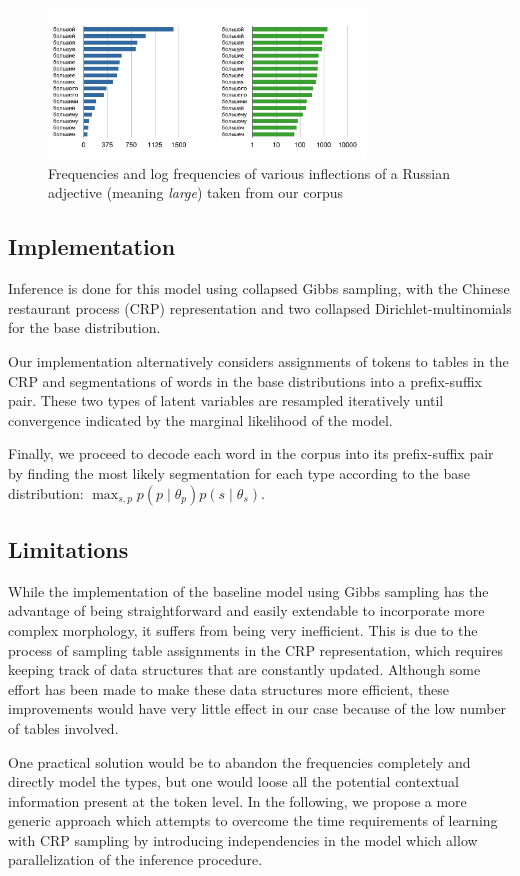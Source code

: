 \begin{figure}[h]
  \centering
  \includegraphics[width=0.75\textwidth]{fig/frequencies}
  \caption{Frequencies and log frequencies of various inflections of a Russian adjective (meaning \textit{large}) taken from our corpus}
  \label{fig:freq}
\end{figure}

\subsection{Implementation}
Inference is done for this model using collapsed Gibbs sampling, with the Chinese restaurant process (CRP) representation and two collapsed Dirichlet-multinomials for the base distribution.

Our implementation alternatively considers assignments of tokens to tables in the CRP and segmentations of words in the base distributions into a prefix-suffix pair. These two types of latent variables are resampled iteratively until convergence indicated by the marginal likelihood of the model.

Finally, we proceed to decode each word in the corpus into its prefix-suffix pair by finding the most likely segmentation for each type according to the base distribution: $\max_{s,p} p(p \mid \theta_p) p(s \mid \theta_s)$.

\subsection{Limitations}

While the implementation of the baseline model using Gibbs sampling has the advantage of being straightforward and easily extendable to incorporate more complex morphology, it suffers from being very inefficient. This is due to the process of sampling table assignments in the CRP representation, which requires keeping track of data structures that are constantly updated. Although some effort has been made \cite{blunsom2009} to make these data structures more efficient, these improvements would have very little effect in our case because of the low number of tables involved.

One practical solution would be to abandon the frequencies completely and directly model the types, but one would loose all the potential contextual information present at the token level. In the following, we propose a more generic approach which attempts to overcome the time requirements of learning with CRP sampling by introducing independencies in the model which allow parallelization of the inference procedure.

